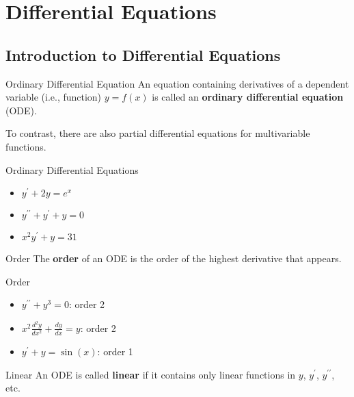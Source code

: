 \chapter{Differential Equations}
\section{Introduction to Differential Equations}
\begin{Definition}{Ordinary Differential Equation}{}
    An equation containing derivatives of a dependent variable (i.e., function) $ y=f(x) $
    is called an \textbf{ordinary differential equation} (ODE).
\end{Definition}

\begin{Remark}{}{}
    To contrast, there are also partial differential equations for multivariable functions.
\end{Remark}

\begin{Example}{Ordinary Differential Equations}{}
    \begin{itemize}
        \item $ y^\prime+2y=e^x $
        \item $ y^{\prime\prime}+y^\prime+y=0 $
        \item $ x^2y^\prime+y=31 $
    \end{itemize}
\end{Example}

\begin{Definition}{Order}{}
    The \textbf{order} of an ODE is the order of the highest derivative that appears.
\end{Definition}

\begin{Example}{Order}{}
    \begin{itemize}
        \item $ y^{\prime\prime}+y^3=0 $: order 2
        \item $ x^2 \frac{d^2y}{dx^2} +\frac{dy}{dx} =y $: order 2
        \item $ y^\prime+y=\sin(x) $: order 1
    \end{itemize}
\end{Example}

\begin{Definition}{Linear}{}
    An ODE is called \textbf{linear} if it contains only linear functions in $ y $, $ y^\prime $,
    $ y^{\prime\prime} $, etc.
\end{Definition}


